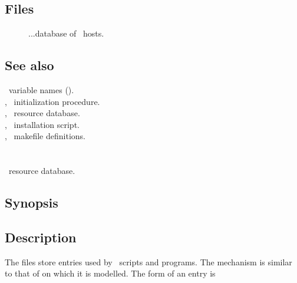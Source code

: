 \subsection*{Files}

\begin{description}
\item[]
...database of \aipspp\ hosts.
\end{description}

\subsection*{See also}

\aipspp\ variable names ().\\
, \aipspp\ initialization procedure.\\
, \aipspp\ resource database.\\
, \aipspp\ installation script.\\
, \aipspp\ makefile definitions.


\newpage
\section{}
\label{aipsrc}



\aipspp\ resource database.

\subsection*{Synopsis}

\begin{synopsis}
\end{synopsis}

\subsection*{Description}

The  files store  entries used by \aipspp\ 
scripts and programs.  The mechanism is similar to that of 
on which it is modelled.  The form of an \file{aipsrc} entry is

